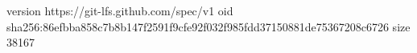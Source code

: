 version https://git-lfs.github.com/spec/v1
oid sha256:86efbba858c7b8b147f2591f9cfe92f032f985fdd37150881de75367208c6726
size 38167
